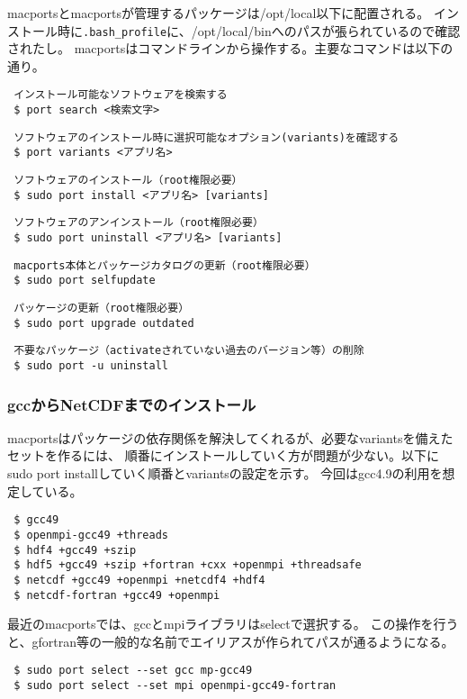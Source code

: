 macportsとmacportsが管理するパッケージは/opt/local以下に配置される。
インストール時に\verb|.bash_profile|に、/opt/local/binへのパスが張られているので確認されたし。
macportsはコマンドラインから操作する。主要なコマンドは以下の通り。

\begin{verbatim}
 インストール可能なソフトウェアを検索する
 $ port search <検索文字>
\end{verbatim}
\begin{verbatim}
 ソフトウェアのインストール時に選択可能なオプション(variants)を確認する
 $ port variants <アプリ名>
\end{verbatim}
\begin{verbatim}
 ソフトウェアのインストール（root権限必要）
 $ sudo port install <アプリ名> [variants]
\end{verbatim}
\begin{verbatim}
 ソフトウェアのアンインストール（root権限必要）
 $ sudo port uninstall <アプリ名> [variants]
\end{verbatim}
\begin{verbatim}
 macports本体とパッケージカタログの更新（root権限必要）
 $ sudo port selfupdate
\end{verbatim}
\begin{verbatim}
 パッケージの更新（root権限必要）
 $ sudo port upgrade outdated
\end{verbatim}
\begin{verbatim}
 不要なパッケージ（activateされていない過去のバージョン等）の削除
 $ sudo port -u uninstall
\end{verbatim}

\subsubsection{gccからNetCDFまでのインストール}

macportsはパッケージの依存関係を解決してくれるが、必要なvariantsを備えたセットを作るには、
順番にインストールしていく方が問題が少ない。以下にsudo port installしていく順番とvariantsの設定を示す。
今回はgcc4.9の利用を想定している。
\begin{verbatim}
 $ gcc49
 $ openmpi-gcc49 +threads
 $ hdf4 +gcc49 +szip
 $ hdf5 +gcc49 +szip +fortran +cxx +openmpi +threadsafe
 $ netcdf +gcc49 +openmpi +netcdf4 +hdf4
 $ netcdf-fortran +gcc49 +openmpi
\end{verbatim}

最近のmacportsでは、gccとmpiライブラリはselectで選択する。
この操作を行うと、gfortran等の一般的な名前でエイリアスが作られてパスが通るようになる。
\begin{verbatim}
 $ sudo port select --set gcc mp-gcc49
 $ sudo port select --set mpi openmpi-gcc49-fortran
\end{verbatim}

